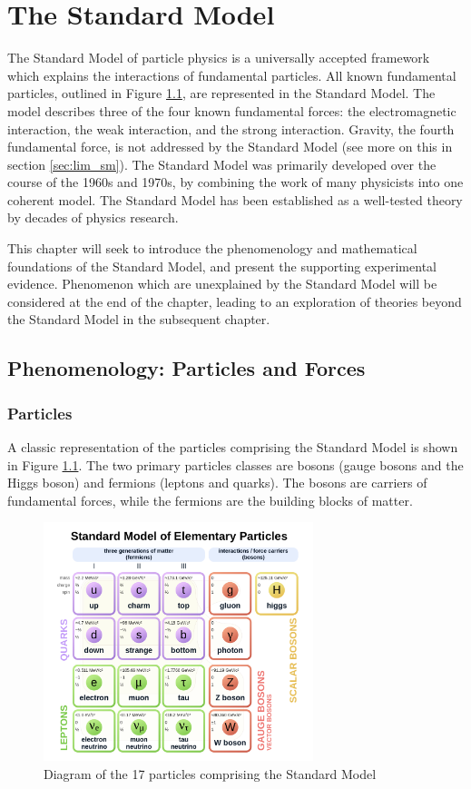 \chapter{The Standard Model}
The Standard Model of particle physics is a universally accepted framework which explains the interactions of fundamental particles. All known fundamental particles, outlined in Figure \ref{fig:sm}, are represented in the Standard Model. The model describes three of the four known fundamental forces: the electromagnetic interaction, the weak interaction, and the strong interaction. Gravity, the fourth fundamental force, is not addressed by the Standard Model (see more on this in section \ref{sec:lim_sm}). The Standard Model was primarily developed over the course of the 1960s and 1970s, by combining the work of many physicists into one coherent model. The Standard Model has been established as a well-tested theory by decades of physics research.\par

This chapter will seek to introduce the phenomenology and mathematical foundations of the Standard Model, and present the supporting experimental evidence. Phenomenon which are unexplained by the Standard Model will be considered at the end of the chapter, leading to an exploration of theories beyond the Standard Model in the subsequent chapter.

\section{Phenomenology: Particles and Forces}
\subsection{Particles}
A classic representation of the particles comprising the Standard Model is shown in Figure \ref{fig:sm}. The two primary particles classes are bosons (gauge bosons and the Higgs boson) and fermions (leptons and quarks). The bosons are carriers of fundamental forces, while the fermions are the building blocks of matter. 

\begin{figure}
	\includegraphics[width=0.7\textwidth]{figures/ch1/standard_model.png}
	\caption{Diagram of the 17 particles comprising the Standard Model}
	\label{fig:sm}
\end{figure}

